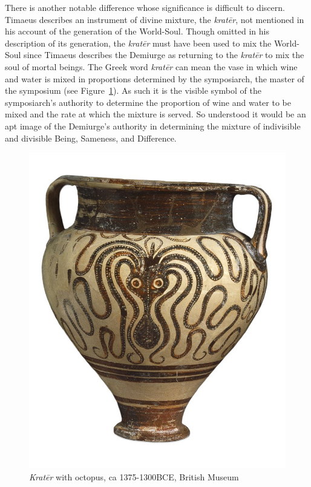 There is another notable difference whose significance is difficult to discern. Timae\-us describes an instrument of divine mixture, the \emph{kratēr}, not mentioned in his account of the generation of the World-Soul. Though omitted in his description of its generation, the \emph{kratēr} must have been used to mix the World-Soul since Timaeus describes the Demiurge as returning to the \emph{kratēr} to mix the soul of mortal beings. The Greek word \emph{kratēr} can mean the vase in which wine and water is mixed in proportions determined by the symposiarch, the master of the symposium (see Figure~\ref{fig:krater}). As such it is the visible symbol of the symposiarch's authority to determine the proportion of wine and water to be mixed and the rate at which the mixture is served. So understood it would be an apt image of the Demiurge's authority in determining the mixture of indivisible and divisible Being, Sameness, and Difference. 

\begin{figure}[htbp]
     \centering
         \includegraphics[scale=0.25]{graphics/krater.jpg}
     \caption{\emph{Kratēr} with octopus, ca 1375-1300BCE, British Museum}
     \label{fig:krater}
\end{figure}

